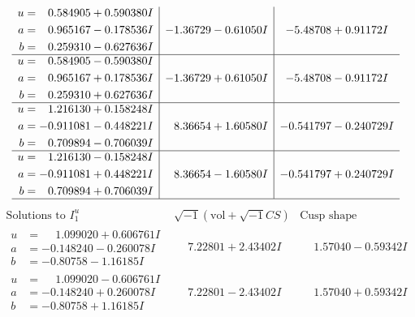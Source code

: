 \documentclass[1p]{elsarticle_modified}
\theoremstyle{definition}
\newcommand{\I}{\sqrt{-1}}
\begin{document}
$$\begin{array}{c|c|c}
\begin{aligned}
u &= \phantom{-}0.584905 + 0.590380 I \\
a &= \phantom{-}0.965167 - 0.178536 I \\
b &= \phantom{-}0.259310 - 0.627636 I\end{aligned}
 & -1.36729 - 0.61050 I & -5.48708 + 0.91172 I \\ \hline\begin{aligned}
u &= \phantom{-}0.584905 - 0.590380 I \\
a &= \phantom{-}0.965167 + 0.178536 I \\
b &= \phantom{-}0.259310 + 0.627636 I\end{aligned}
 & -1.36729 + 0.61050 I & -5.48708 - 0.91172 I \\ \hline\begin{aligned}
u &= \phantom{-}1.216130 + 0.158248 I \\
a &= -0.911081 - 0.448221 I \\
b &= \phantom{-}0.709894 - 0.706039 I\end{aligned}
 & \phantom{-}8.36654 + 1.60580 I & -0.541797 - 0.240729 I \\ \hline\begin{aligned}
u &= \phantom{-}1.216130 - 0.158248 I \\
a &= -0.911081 + 0.448221 I \\
b &= \phantom{-}0.709894 + 0.706039 I\end{aligned}
 & \phantom{-}8.36654 - 1.60580 I & -0.541797 + 0.240729 I\\
 \hline 
 \end{array}$$\newpage$$\begin{array}{c|c|c}  
\text{Solutions to }I^u_{1}& \I (\text{vol} + \sqrt{-1}CS) & \text{Cusp shape}\\
 \hline 
\begin{aligned}
u &= \phantom{-}1.099020 + 0.606761 I \\
a &= -0.148240 - 0.260078 I \\
b &= -0.80758 - 1.16185 I\end{aligned}
 & \phantom{-}7.22801 + 2.43402 I & \phantom{-}1.57040 - 0.59342 I \\ \hline\begin{aligned}
u &= \phantom{-}1.099020 - 0.606761 I \\
a &= -0.148240 + 0.260078 I \\
b &= -0.80758 + 1.16185 I\end{aligned}
 & \phantom{-}7.22801 - 2.43402 I & \phantom{-}1.57040 + 0.59342 I \\ \hline\begin{aligned}

\end{aligned}
\end{array}$$
\end{document}

